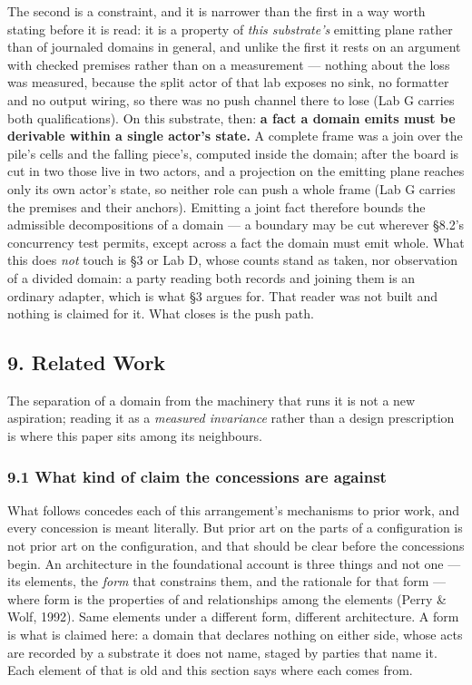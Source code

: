 \documentclass[
]{article}
\begin{document}
The second is a constraint, and it is narrower than the first in a way
worth stating before it is read: it is a property of \emph{this
substrate's} emitting plane rather than of journaled domains in general,
and unlike the first it rests on an argument with checked premises
rather than on a measurement --- nothing about the loss was measured,
because the split actor of that lab exposes no sink, no formatter and no
output wiring, so there was no push channel there to lose (Lab G carries
both qualifications). On this substrate, then: \textbf{a fact a domain
emits must be derivable within a single actor's state.} A complete frame
was a join over the pile's cells and the falling piece's, computed
inside the domain; after the board is cut in two those live in two
actors, and a projection on the emitting plane reaches only its own
actor's state, so neither role can push a whole frame (Lab G carries the
premises and their anchors). Emitting a joint fact therefore bounds the
admissible decompositions of a domain --- a boundary may be cut wherever
§8.2's concurrency test permits, except across a fact the domain must
emit whole. What this does \emph{not} touch is §3 or Lab D, whose counts
stand as taken, nor observation of a divided domain: a party reading
both records and joining them is an ordinary adapter, which is what §3
argues for. That reader was not built and nothing is claimed for it.
What closes is the push path.

\subsection{9. Related Work}\label{related-work}

The separation of a domain from the machinery that runs it is not a new
aspiration; reading it as a \emph{measured invariance} rather than a
design prescription is where this paper sits among its neighbours.

\subsubsection{9.1 What kind of claim the concessions are
against}\label{what-kind-of-claim-the-concessions-are-against}

What follows concedes each of this arrangement's mechanisms to prior
work, and every concession is meant literally. But prior art on the
parts of a configuration is not prior art on the configuration, and that
should be clear before the concessions begin. An architecture in the
foundational account is three things and not one --- its elements, the
\emph{form} that constrains them, and the rationale for that form ---
where form is the properties of and relationships among the elements
(Perry \& Wolf, 1992). Same elements under a different form, different
architecture. A form is what is claimed here: a domain that declares
nothing on either side, whose acts are recorded by a substrate it does
not name, staged by parties that name it. Each element of that is old
and this section says where each comes from.
\end{document}

